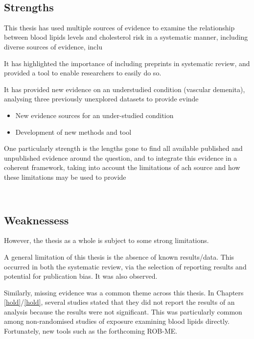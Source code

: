 \documentclass[a4paper, twoside]{templates/ociamthesis}
\providecommand{\tightlist}{%
  \setlength{\itemsep}{0pt}\setlength{\parskip}{0pt}}
\begin{document}
~

\hypertarget{strengths-3}{%
\subsection{Strengths}\label{strengths-3}}

This thesis has used multiple sources of evidence to examine the relationship between blood lipids levels and cholesterol risk in a systematic manner, including diverse sources of evidence, inclu

It has highlighted the importance of including preprints in systematic review, and provided a tool to enable researchers to easily do so.

It has provided new evidence on an understudied condition (vascular demenita), analysing three previously unexplored datasets to provide evinde

\begin{itemize}
\tightlist
\item
  New evidence sources for an under-studied condition
\item
  Development of new methods and tool
\end{itemize}

One particularly strength is the lengths gone to find all available published and unpublished evidence around the question, and to integrate this evidence in a coherent framework, taking into account the limitations of ach source and how these limitations may be used to provide

~

\newpage

\hypertarget{weaknessess}{%
\subsection{Weaknessess}\label{weaknessess}}

However, the thesis as a whole is subject to some strong limitations.

A general limitation of this thesis is the absence of known results/data. This occurred in both the systematic review, via the selection of reporting results and potential for publication bias. It was also observed.

Similarly, missing evidence was a common theme across this thesis. In Chapters \ref{hold}/\ref{hold}, several studies stated that they did not report the results of an analysis because the results were not significant. This was particularly common among non-randomised studies of exposure examining blood lipids directly. Fortunately, new tools such as the forthcoming ROB-ME.
\end{document}
